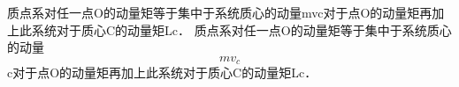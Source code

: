 质点系对任一点O的动量矩等于集中于系统质心的动量mvc对于点O的动量矩再加上此系统对于质心C的动量矩Lc．
质点系对任一点O的动量矩等于集中于系统质心的动量\begin{equation}
mv_c
\end{equation}c对于点O的动量矩再加上此系统对于质心C的动量矩Lc．